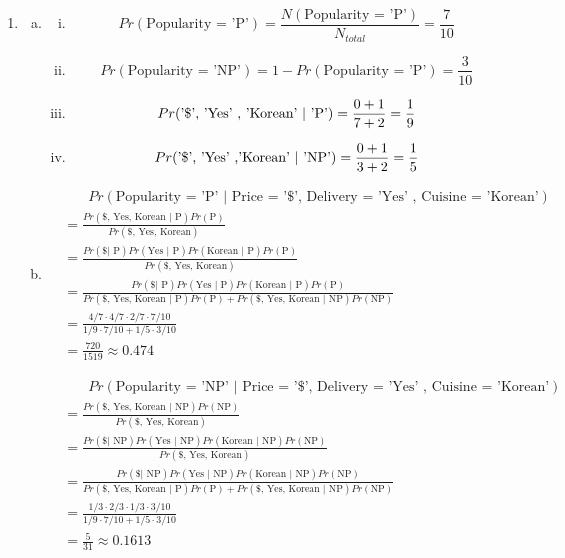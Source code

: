 \documentclass[11pt]{article}
\begin{document}
	\begin{enumerate}
		\item 
		\begin{enumerate}[a.]
			\item 
			\begin{enumerate}[i.]
				\item \[Pr(\text{Popularity = 'P'}) = \frac{N(\text{Popularity = 'P'})}{N_{total}} = \frac{7}{10} \]
				\item \[Pr(\text{Popularity = 'NP'}) = 1 - Pr(\text{Popularity = 'P'}) = \frac{3}{10}\]
				\item \[Pr\text{('\$', 'Yes' , 'Korean' $|$ 'P')}\\ = \frac{0 + 1}{7 + 2} = \frac{1}{9}\]
				\item \[Pr\text{('\$', 'Yes' ,'Korean' $|$ 'NP')}\\ = \frac{0 + 1}{3 + 2} = \frac{1}{5}\]
			\end{enumerate}
			\item 
			\begin{align}
				&\phantom{ =\ \ }Pr(\text{Popularity = 'P' $|$ Price = '\$', Delivery = 'Yes' , Cuisine = 'Korean'})\nonumber\\
				&=\frac{Pr(\text{\$, Yes, Korean $|$ P})Pr(\text{P})}{Pr(\text{\$, Yes, Korean})}\nonumber\\
				&=\frac{Pr(\text{\$ $|$ P})Pr(\text{Yes $|$ P})Pr(\text{Korean $|$ P})Pr(\text{P})}{Pr(\text{\$, Yes, Korean})}\nonumber\\
				&=\frac{Pr(\text{\$ $|$ P})Pr(\text{Yes $|$ P})Pr(\text{Korean $|$ P})Pr(\text{P})}{Pr(\text{\$, Yes, Korean $|$ P})Pr(\text{P}) + Pr(\text{\$, Yes, Korean $|$ NP})Pr(\text{NP})}\nonumber\\
				&= \frac{4/7 \cdot 4/7 \cdot 2/7 \cdot 7/10}{1/9 \cdot 7/10 + 1/5 \cdot 3/10}\nonumber\\
				&= \frac{720}{1519} \approx 0.474\nonumber
			\end{align}
			
			\begin{align}
				&\phantom{ =\ \ }Pr(\text{Popularity = 'NP' $|$ Price = '\$', Delivery = 'Yes' , Cuisine = 'Korean'})\nonumber\\
				&=\frac{Pr(\text{\$, Yes, Korean $|$ NP})Pr(\text{NP})}{Pr(\text{\$, Yes, Korean})}\nonumber\\
				&=\frac{Pr(\text{\$ $|$ NP})Pr(\text{Yes $|$ NP})Pr(\text{Korean $|$ NP})Pr(\text{NP})}{Pr(\text{\$, Yes, Korean})}\nonumber\\
				&=\frac{Pr(\text{\$ $|$ NP})Pr(\text{Yes $|$ NP})Pr(\text{Korean $|$ NP})Pr(\text{NP})}{Pr(\text{\$, Yes, Korean $|$ P})Pr(\text{P}) + Pr(\text{\$, Yes, Korean $|$ NP})Pr(\text{NP})}\nonumber\\
				&= \frac{1/3 \cdot 2/3 \cdot 1/3 \cdot 3/10}{1/9 \cdot 7/10 + 1/5 \cdot 3/10}\nonumber\\
				&= \frac{5}{31} \approx 0.1613\nonumber
			\end{align}
			

\end{enumerate}
\end{enumerate}
\end{document}
